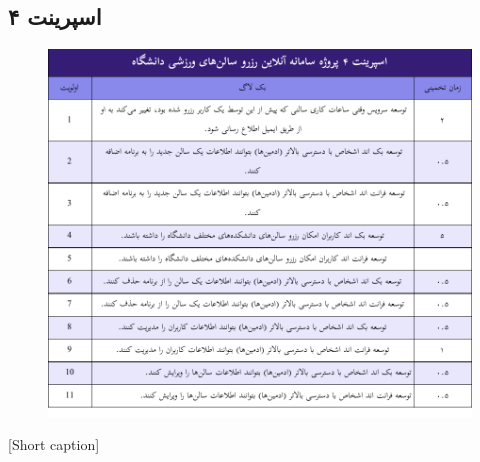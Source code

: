 \subsection{
اسپرینت ۴
}
\begin{center}
  \begin{figure} [H]
    { \includegraphics[page=1, width=\textwidth]{appandecies/sprint_4.pdf}}
  \end{figure}
  [Short caption]{}
\end{center}